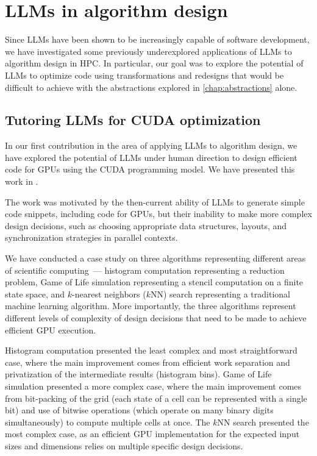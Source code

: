 \chapter{LLMs in algorithm design}\label{chap:llms}

Since LLMs have been shown to be increasingly capable of software development, we have investigated some previously underexplored applications of LLMs to algorithm design in HPC\@. In particular, our goal was to explore the potential of LLMs to optimize code using transformations and redesigns that would be difficult to achieve with the abstractions explored in \cref{chap:abstractions} alone.


\section{Tutoring LLMs for CUDA optimization}\label{sec:human-directed-code-optimization}

In our first contribution in the area of applying LLMs to algorithm design, we have explored the potential of LLMs under human direction to design efficient code for GPUs using the CUDA programming model. We have presented this work in .

The work was motivated by the then-current ability of LLMs to generate simple code snippets, including code for GPUs, but their inability to make more complex design decisions, such as choosing appropriate data structures, layouts, and synchronization strategies in parallel contexts.

We have conducted a case study on three algorithms representing different areas of scientific computing~--- histogram computation representing a reduction problem, Game of Life simulation representing a stencil computation on a finite state space, and $k$-nearest neighbors ($k$NN) search representing a traditional machine learning algorithm. More importantly, the three algorithms represent different levels of complexity of design decisions that need to be made to achieve efficient GPU execution.

Histogram computation presented the least complex and most straightforward case, where the main improvement comes from efficient work separation and privatization of the intermediate results (histogram bins). Game of Life simulation presented a more complex case, where the main improvement comes from bit-packing of the grid (each state of a cell can be represented with a single bit) and use of bitwise operations (which operate on many binary digits simultaneously) to compute multiple cells at once. The $k$NN search presented the most complex case, as an efficient GPU implementation for the expected input sizes and dimensions relies on multiple specific design decisions.

